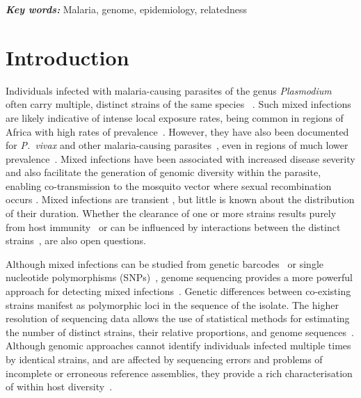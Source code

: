 \documentclass[9pt,lineno]{elife}
\providecommand{\keywords}[1]{\textbf{\textit{Key words:}} #1}
\begin{document}
\keywords{Malaria, genome, epidemiology, relatedness}


\section{Introduction}


Individuals infected with malaria-causing parasites of the genus {\it Plasmodium} often carry multiple, distinct strains of the same species ~\citep{Bell2006}.  Such mixed infections are likely indicative of intense local exposure rates, being common in regions of Africa with high rates of prevalence~\citep{Howes2016}. However, they have also been documented for {\it P.~vivax} and other malaria-causing parasites~\citep{Mueller2007, Collins2012}, even in regions of much lower prevalence~\citep{Howes2016, Steenkeste2010}.  Mixed infections have been associated with increased disease severity \citep{deRoode2005} and also facilitate the generation of genomic diversity within the parasite, enabling co-transmission to the mosquito vector where sexual recombination occurs \citep{Mzilahowa2007}.  Mixed infections are transient \citep{Bruce2002, Zimmerman2004}, but little is known about the distribution of their duration. Whether the clearance of one or more strains results purely from host immunity~\citep{Borrmann2011} or can be influenced by interactions between the distinct strains~\citep{Enosse2006, Bushman2016}, are also open questions.

Although mixed infections can be studied from genetic barcodes~\citep{Galinsky2015} or single nucleotide polymorphisms (SNPs)~\citep{Jack2016}, genome sequencing provides a more powerful approach for detecting mixed infections~\citep{Chang2017}.  Genetic differences between co-existing strains manifest as polymorphic loci in the sequence of the isolate. The higher resolution of sequencing data allows the use of statistical methods for estimating the number of distinct strains, their relative proportions, and genome sequences~\citep{Zhu2017}.  Although genomic approaches cannot identify individuals infected multiple times by identical strains, and are affected by sequencing errors and problems of incomplete or erroneous reference assemblies, they provide a rich characterisation of within host diversity~\citep{Manske2012}.
\end{document}
